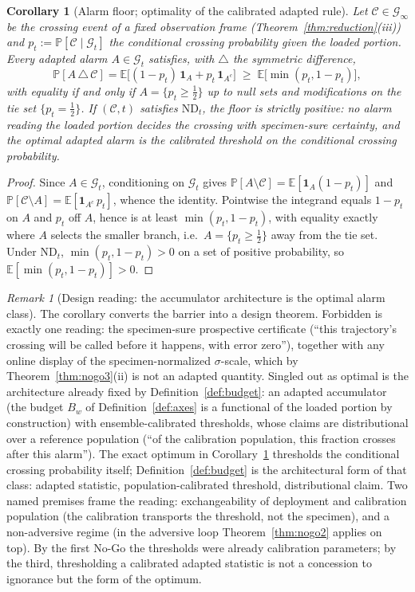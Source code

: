 \documentclass[11pt]{article}
\theoremstyle{plain}
\newtheorem{corollary}[theorem]{Corollary}
\theoremstyle{definition}
\theoremstyle{remark}
\newtheorem{remark}[theorem]{Remark}
\newcommand{\E}{\mathbb{E}}
\begin{document}
\begin{corollary}[Alarm floor; optimality of the calibrated adapted rule]\label{cor:alarmfloor}
Let $\mathcal C\in\mathcal G_\infty$ be the crossing event of a fixed observation frame (Theorem~\ref{thm:reduction}(iii)) and $p_t:=\mathbb P[\mathcal C\mid\mathcal G_t]$ the conditional crossing probability given the loaded portion. Every adapted alarm $A\in\mathcal G_t$ satisfies, with $\triangle$ the symmetric difference,
\[
\mathbb P[A\,\triangle\,\mathcal C]=\E\big[(1-p_t)\,\mathbf 1_{A}+p_t\,\mathbf 1_{A^c}\big]\;\ge\;\E\big[\min(p_t,1-p_t)\big],
\]
with equality if and only if $A=\{p_t\ge\tfrac12\}$ up to null sets and modifications on the tie set $\{p_t=\tfrac12\}$. If $(\mathcal C,t)$ satisfies $\mathrm{ND}_t$, the floor is strictly positive: no alarm reading the loaded portion decides the crossing with specimen-sure certainty, and the optimal adapted alarm is the calibrated threshold on the conditional crossing probability.
\end{corollary}
\begin{proof}
Since $A\in\mathcal G_t$, conditioning on $\mathcal G_t$ gives $\mathbb P[A\setminus\mathcal C]=\E[\mathbf 1_A(1-p_t)]$ and $\mathbb P[\mathcal C\setminus A]=\E[\mathbf 1_{A^c}\,p_t]$, whence the identity. Pointwise the integrand equals $1-p_t$ on $A$ and $p_t$ off $A$, hence is at least $\min(p_t,1-p_t)$, with equality exactly where $A$ selects the smaller branch, i.e.\ $A=\{p_t\ge\frac12\}$ away from the tie set. Under $\mathrm{ND}_t$, $\min(p_t,1-p_t)>0$ on a set of positive probability, so $\E[\min(p_t,1-p_t)]>0$.
\end{proof}

\begin{remark}[Design reading: the accumulator architecture is the optimal alarm class]\label{rem:nogo3design}
The corollary converts the barrier into a design theorem. Forbidden is exactly one reading: the specimen-sure prospective certificate (``this trajectory's crossing will be called before it happens, with error zero''), together with any online display of the specimen-normalized $\sigma$-scale, which by Theorem~\ref{thm:nogo3}(ii) is not an adapted quantity. Singled out as optimal is the architecture already fixed by Definition~\ref{def:budget}: an adapted accumulator (the budget $B_w$ of Definition~\ref{def:axes} is a functional of the loaded portion by construction) with ensemble-calibrated thresholds, whose claims are distributional over a reference population (``of the calibration population, this fraction crosses after this alarm''). The exact optimum in Corollary~\ref{cor:alarmfloor} thresholds the conditional crossing probability itself; Definition~\ref{def:budget} is the architectural form of that class: adapted statistic, population-calibrated threshold, distributional claim. Two named premises frame the reading: exchangeability of deployment and calibration population (the calibration transports the threshold, not the specimen), and a non-adversive regime (in the adversive loop Theorem~\ref{thm:nogo2} applies on top). By the first No-Go the thresholds were already calibration parameters; by the third, thresholding a calibrated adapted statistic is not a concession to ignorance but the form of the optimum.
\end{remark}
\end{document}
